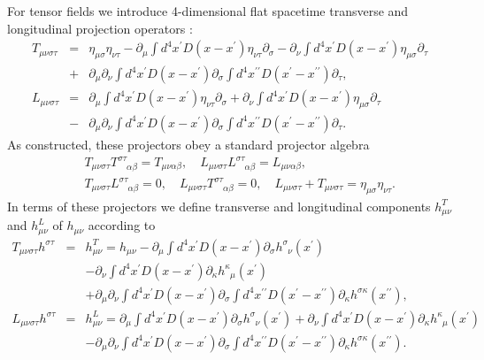For tensor fields we introduce 4-dimensional flat  spacetime transverse and longitudinal projection operators \cite{mannheim_2005,amarasinghe_2019}: 
%
\begin{eqnarray}
T_{\mu\nu\sigma\tau}&=&\eta_{\mu\sigma}\eta_{\nu\tau}
-\partial_{\mu}\int d^4x^{\prime}D(x-x^{\prime})
\eta_{\nu\tau}\partial_{\sigma}
-\partial_{\nu}\int d^4x^{\prime}D(x-x^{\prime})
\eta_{\mu\sigma}\partial_{\tau}
\nonumber \\
&+&\partial_{\mu}\partial_{\nu}\int
d^4x^{\prime}D(x-x^{\prime})\partial_{\sigma}\int
d^4x^{\prime\prime}D(x^{\prime}-x^{\prime\prime})
\partial_{\tau},
\nonumber\\
L_{\mu\nu\sigma\tau}&=&\partial_{\mu}\int d^4x^{\prime}D(x-x^{\prime})
\eta_{\nu\tau}\partial_{\sigma}
+\partial_{\nu}\int d^4x^{\prime}D(x-x^{\prime})
\eta_{\mu\sigma}\partial_{\tau}
\nonumber \\
&-&\partial_{\mu}\partial_{\nu}\int
d^4x^{\prime}D(x-x^{\prime})\partial_{\sigma}\int
d^4x^{\prime\prime}D(x^{\prime}-x^{\prime\prime})
\partial_{\tau}.
\label{A.9a}
\end{eqnarray}
%
As constructed, these projectors obey a standard projector algebra
%
\begin{eqnarray}
&&T_{\mu\nu\sigma\tau}T^{\sigma\tau}_{\phantom{\sigma\tau}\alpha\beta}=
T_{\mu\nu\alpha\beta},\quad
L_{\mu\nu\sigma\tau}L^{\sigma\tau}_{\phantom{\sigma\tau}\alpha\beta}
=L_{\mu\nu\alpha\beta},
\nonumber \\
&&T_{\mu\nu\sigma\tau}L^{\sigma\tau}_{\phantom{\sigma\tau}\alpha\beta}=
0,\quad
L_{\mu\nu\sigma\tau}T^{\sigma\tau}_{\phantom{\sigma\tau}\alpha\beta}
=0,\quad L_{\mu\nu\sigma\tau}
+T_{\mu\nu\sigma\tau}
=\eta_{\mu\sigma}\eta_{\nu\tau}.
\label{A.10a}
\end{eqnarray}
% 
In terms of these projectors we define transverse and longitudinal components $h^{T}_{\mu\nu}$ and $h^{L}_{\mu\nu}$ of $h_{\mu\nu}$ according to
% 
\begin{eqnarray}
T_{\mu\nu\sigma\tau}h^{\sigma\tau}&=&h^{T}_{\mu\nu}=h_{\mu\nu}
-\partial_{\mu}\int
d^4x^{\prime}D(x-x^{\prime})\partial_{\sigma}
h^{\sigma}_{\phantom{\sigma}\nu}(x^{\prime})  
\nonumber\\
&&
-\partial_{\nu}\int d^4x^{\prime}D(x-x^{\prime})
\partial_{\kappa}h^{\kappa}_{\phantom{\kappa}\mu}(x^{\prime})
\nonumber \\
&&+\partial_{\mu}\partial_{\nu}\int
d^4x^{\prime}D(x-x^{\prime})\partial_{\sigma}\int
d^4x^{\prime\prime}D(x^{\prime}-x^{\prime\prime})
\partial_{\kappa}h^{\sigma\kappa}(x^{\prime\prime}),
\nonumber\\
L_{\mu\nu\sigma\tau}h^{\sigma\tau}&=&h^{L}_{\mu\nu}=\partial_{\mu}\int
d^4x^{\prime}D(x-x^{\prime})\partial_{\sigma}
h^{\sigma}_{\phantom{\sigma}\nu}(x^{\prime}) 
+\partial_{\nu}\int d^4x^{\prime}D(x-x^{\prime})
\partial_{\kappa}h^{\kappa}_{\phantom{\kappa}\mu}(x^{\prime})
\nonumber \\
&&-\partial_{\mu}\partial_{\nu}\int
d^4x^{\prime}D(x-x^{\prime})\partial_{\sigma}\int
d^4x^{\prime\prime}D(x^{\prime}-x^{\prime\prime})
\partial_{\kappa}h^{\sigma\kappa}(x^{\prime\prime}).
\label{A.11a}
\end{eqnarray}
